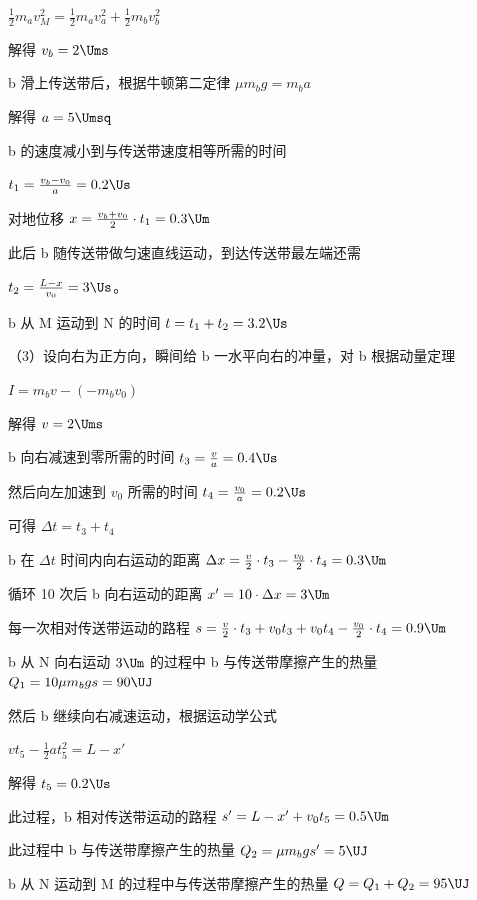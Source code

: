 \documentclass[\gkver]{gaokaozhenti}
\begin{document}
\begin{enumerate}
{$\frac{1}{2}m_{a}v_{M}^{2} = \frac{1}{2}m_{a}v_{a}^{2} + \frac{1}{2}m_{b}v_{b}^{2}$

解得 $v_{b} = 2 \Ums$

b 滑上传送带后，根据牛顿第二定律 $\mu m_{b}g = m_{b}a$

解得 $a = 5 \Umsq$

b 的速度减小到与传送带速度相等所需的时间

$t_{1} = \frac{v_{b} - v_{0}}{a} = 0.2 \Us$

对地位移 $x = \frac{v_{b} + v_{0}}{2} \cdot t_{1} = 0.3 \Um$

此后 b 随传送带做匀速直线运动，到达传送带最左端还需

$t_{2} = \frac{L - x}{v_{0}} = 3 \Us$。

b 从 M 运动到 N 的时间 $t = t_{1} + t_{2} = 3.2 \Us$

（3）设向右为正方向，瞬间给 b 一水平向右的冲量，对 b 根据动量定理

$I = m_{b}v - (-m_{b}v_{0})$

解得 $v = 2 \Ums$

b 向右减速到零所需的时间 $t_{3} = \frac{v}{a} = 0.4 \Us$

然后向左加速到 $v_{0}$ 所需的时间 $t_{4} = \frac{v_{0}}{a} = 0.2 \Us$

可得 $\Delta t = t_{3} + t_{4}$

b 在 $\Delta t$ 时间内向右运动的距离 $\Delta x = \frac{v}{2} \cdot t_{3} - \frac{v_{0}}{2} \cdot t_{4} = 0.3 \Um$

循环 10 次后 b 向右运动的距离 $x' = 10 \cdot \Delta x = 3 \Um$

每一次相对传送带运动的路程 $s = \frac{v}{2} \cdot t_{3} + v_{0}t_{3} + v_{0}t_{4} - \frac{v_{0}}{2} \cdot t_{4} = 0.9 \Um$

b 从 N 向右运动 $3 \Um$ 的过程中 b 与传送带摩擦产生的热量 $Q_{1} = 10\mu m_{b}gs = 90 \UJ$

然后 b 继续向右减速运动，根据运动学公式

$vt_{5} - \frac{1}{2}at_{5}^{2} = L - x'$

解得 $t_{5} = 0.2 \Us$

此过程，b 相对传送带运动的路程 $s' = L - x' + v_{0}t_{5} = 0.5 \Um$

此过程中 b 与传送带摩擦产生的热量 $Q_{2} = \mu m_{b}gs' = 5 \UJ$

b 从 N 运动到 M 的过程中与传送带摩擦产生的热量 $Q = Q_{1} + Q_{2} = 95 \UJ$
}

\end{enumerate}
\end{document}
